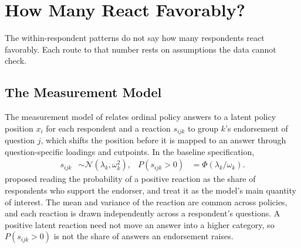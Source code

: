 \documentclass[11pt,letterpaper]{article}
\begin{document}
\section{How Many React Favorably?}
\label{sec:model}

The within-respondent patterns do not say how many respondents react favorably. Each route to that number rests on assumptions the data cannot check.

\subsection{The Measurement Model}

The measurement model of \citet{bullock2011statistical} relates ordinal policy answers to a latent policy position $x_i$ for each respondent and a reaction $s_{ijk}$ to group $k$'s endorsement of question $j$, which shifts the position before it is mapped to an answer through question-specific loadings and cutpoints. In the baseline specification,
\begin{align}
s_{ijk} &\sim \mathcal{N}(\lambda_k,\omega_k^2), &
P(s_{ijk}>0) &= \Phi(\lambda_k/\omega_k).
\label{eq:latent_probability}
\end{align}
\citet{blair2014comparing} proposed reading the probability of a positive reaction as the share of respondents who support the endorser, and \citet{rosenfeld2016validation} treat it as the model's main quantity of interest. The mean and variance of the reaction are common across policies, and each reaction is drawn independently across a respondent's questions. A positive latent reaction need not move an answer into a higher category, so $P(s_{ijk}>0)$ is not the share of answers an endorsement raises.
\end{document}
